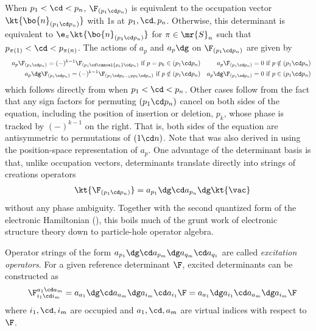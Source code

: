 \documentclass[11pt,fleqn]{article}
\numberwithin{equation}{section}
\begin{document}
\begin{rmk}
When $p_1<\cd<p_n$, $\F_{(p_1\cd p_n)}$ is equivalent to the occupation vector $\kt{\bo{n}_{(p_1\cd p_n)}}$ with 1s at $p_1,\cd,p_n$.
Otherwise, this determinant is equivalent to $\e_{\pi}\kt{\bo{n}_{(p_1\cd p_n)}}$ for $\pi\in\mr{S}_n$ such that $p_{\pi(1)}<\cd<p_{\pi(n)}$.
The actions of $a_p$ and $a_p\dg$ on $\F_{(p_1\cd p_n)}$ are given by
\begin{align}
&&\label{abstract-annihilation-operator-action}
  a_p\F_{(p_1\cd p_n)}
=
  (-)^{k-1}\F_{(p_1\cd\cancel{p_k}\cd p_n)}
  \ \text{if $p=p_k\in(p_1\cd p_n)$}
&&
  a_p\F_{(p_1\cd p_n)}
=
  0
  \ \text{if $p\notin(p_1\cd p_n)$}
\\\label{abstract-creation-operator-action}
&&
  a_p\dg\F_{(p_1\cd p_n)}
=
  (-)^{k-1}\F_{(p_1\cd p_{k-1}pp_k\cd p_n)}
  \ \text{if $p\notin(p_1\cd p_n)$}
&&
  a_p\dg\F_{(p_1\cd p_n)}
=
  0
  \ \text{if $p\in(p_1\cd p_n)$}
\end{align}
which follows directly from  when $p_1<\cd<p_n$.
Other cases follow from the fact that any sign factors for permuting $(p_1\cd p_n)$ cancel on both sides of the equation, including the position of insertion or deletion, $p_k$, whose phase is tracked by $(-)^{k-1}$ on the right.
That is, both sides of the equation are antisymmetric to permutations of $(1\cd n)$.
Note that  was also derived in  using the position-space representation of $a_p$.
One advantage of the determinant basis is that, unlike occupation vectors, determinants translate directly into strings of creations operators
\begin{align}
&&
  \kt{\F_{(p_1\cd p_n)}}
=
  a_{p_1}\dg\cd a_{p_n}\dg\kt{\vac}
\end{align}
without any phase ambiguity.
Together with the second quantized form of the electronic Hamiltonian (), this boils much of the grunt work of electronic structure theory down to particle-hole operator algebra.
\end{rmk}

\begin{dfn}
Operator strings of the form $a_{p_1}\dg\cd a_{p_m}\dg a_{q_m}\cd a_{q_1}$ are called \textit{excitation operators}.
For a given reference determinant $\F$, excited determinants can be constructed as
\begin{align}
&&
  \F_{i_1\cd i_m}^{a_1\cd a_m}
=
  a_{a_1}\dg\cd a_{a_m}\dg a_{i_m}\cd a_{i_1}\F
=
  a_{a_1}\dg a_{i_1}\cd a_{a_m}\dg a_{i_m}\F
\end{align}
where $i_1,\cd,i_m$ are occupied and $a_1,\cd,a_m$ are virtual indices with respect to $\F$.
\end{dfn}
\end{document}
